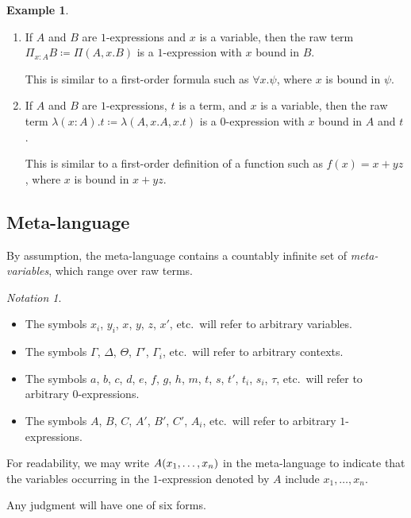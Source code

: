 \documentclass[10pt,letterpaper,cm]{nupset}
\theoremstyle{definition}
\newtheorem{exmp}[definition]{Example}
\theoremstyle{theorem}
\theoremstyle{remark}
\newtheorem*{notation}{Notation}
\newcommand{\0}{\mathbf{0}}
\newcommand{\1}{\mathbf{1}}
\newcommand{\2}{\mathbf{2}}
\newcommand{\bi}{\begin{itemize}}
\newcommand{\ei}{\end{itemize}}
\newcommand{\be}{\begin{enumerate}}
\newcommand{\ee}{\end{enumerate}}
\begin{document}
\begin{exmp} $ $
\be
\item If $A$ and $B$  are $1$-expressions and $x$ is a variable, then the raw term $\Pi_{x:A}B \coloneqq \Pi(A, x.B)$ is a $1$-expression with $x$ bound in $B$. 

This is similar to a first-order formula such as  $\forall{x}.\psi$, where $x$ is bound in $\psi$.  
\item If $A$ and $B$ are $1$-expressions, $t$ is a term, and $x$ is a variable, then the raw term $\lambda(x:A).t \coloneqq \lambda(A, x.A, x.t)$ is a $0$-expression with $x$ bound in $A$ and $t$. 

This is similar to a first-order definition of a function such as $f(x) = x+yz$, where $x$ is bound in $x+yz$.
\ee
\end{exmp}

\subsection*{Meta-language}

By assumption, the meta-language contains a countably infinite set of \textit{meta-variables}, which range over raw terms.  
\begin{notation} $ $
\bi 
\item The symbols $x_i$, $y_i$, $x$, $y$, $z$, $x'$, etc.\  will refer to arbitrary variables. 
\item The symbols $\Gamma$, $\Delta$, $\Theta$, $\Gamma'$, $\Gamma_i$, etc.\  will refer to arbitrary contexts.
\item The symbols $a$, $b$, $c$, $d$, $e$, $f$, $g$, $h$, $m$, $t$, $s$, $t'$, $t_i$, $s_i$, $\tau$, etc.\ will refer to arbitrary $0$-expressions. 
\item The symbols $A$, $B$, $C$, $A'$, $B'$, $C'$, $A_i$, etc.\  will refer to arbitrary $1$-expressions.
\ei
For readability, we may write $A\mleft(x_1, \ldots, x_n\mright)$ in the meta-language to indicate that the variables occurring in the $1$-expression denoted by $A$ include $x_1, \ldots, x_n$.
\end{notation}

\bigskip

Any judgment will have one of six forms.
\end{document}
